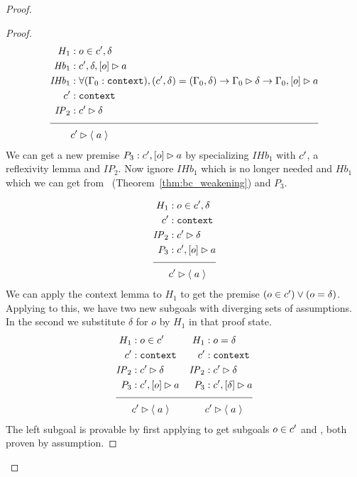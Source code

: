 \begin{proof}
\begin{proof}
\begin{align*}
H_1 &: o \in \inddyncon{} , \delta \\
\mathit{Hb}_1 &: \bchsl[\inddyncon{} , \delta]{o}{a} \\
\mathit{IHb}_1 &: \forall ({\dyncon{}_0} : \sltm{context}), (\inddyncon{} , \delta) = (\dyncon{}_0 , \delta) \rightarrow \seqsl[\dyncon{}_0]{\delta} \rightarrow \bchsl[\dyncon{}_0]{o}{a} \\
\inddyncon{} &: \sltm{context} \\
\mathit{IP}_2 &: \seqsl[\inddyncon{}]{\delta} \\[\pfshift{}]
\cline{1-2}
& \seqsl[\inddyncon{}]{\atom{a}}
\end{align*}
We can get a new premise $P_3 : \bchsl[\inddyncon{}]{o}{a}$ by specializing $\mathit{IHb}_1$ with $\inddyncon{}$, a reflexivity lemma and $\mathit{IP}_2$. Now ignore $\mathit{IHb}_1$ which is no longer needed and $\mathit{Hb}_1$ which we can get from~ (Theorem~\ref{thm:bc_weakening}) and $P_3$.

\begin{align*}
H_1 &: o \in \inddyncon{} , \delta \\
\inddyncon{} &: \sltm{context} \\
\mathit{IP}_2 &: \seqsl[\inddyncon{}]{\delta} \\
P_3 &: \bchsl[\inddyncon{}]{o}{a} \\[\pfshift{}]
\cline{1-2}
& \seqsl[\inddyncon{}]{\atom{a}}
\end{align*}
We can apply the context lemma  to $H_1$ to get the premise $(o \in \inddyncon{}) \vee (o = \delta)$. Applying  to this, we have two new subgoals with diverging sets of assumptions. In the second we substitute $\delta$ for $o$ by $H_1$ in that proof state.
\begin{align*}
H_1 &: o \in \inddyncon{}  &H_1 &: o = \delta \\
\inddyncon{} &: \sltm{context} &\inddyncon{} &: \sltm{context} \\
\mathit{IP}_2 &: \seqsl[\inddyncon{}]{\delta} &\mathit{IP}_2 &: \seqsl[\inddyncon{}]{\delta} \\
P_3 &: \bchsl[\inddyncon{}]{o}{a} &P_3 &: \bchsl[\inddyncon{}]{\delta}{a} \\[\pfshift{}]
\cline{1-5}
& \seqsl[\inddyncon{}]{\atom{a}}
&& \seqsl[\inddyncon{}]{\atom{a}}
\end{align*}
The left subgoal is provable by first applying \rlnmsinit{} to get subgoals $o \in \inddyncon{}$ and , both proven by assumption.


\end{proof}
\end{proof}
